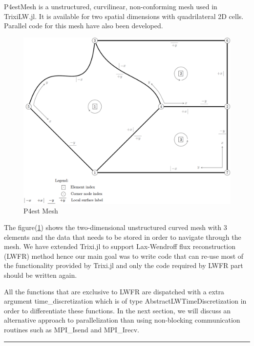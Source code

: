 {\ttfamily P4estMesh} is a unstructured, curvilinear, non-conforming mesh used in {\ttfamily TrixiLW.jl}. It is available for two spatial dimensions with quadrilateral 2D cells. Parallel code for this mesh have also been developed.
\begin{figure}[!ht]
    \centering
    \includegraphics[width=0.80\linewidth]{attachments/p4estmesh.png}
    \caption{P4est Mesh}
    \label{fig:4.2}
\end{figure}

The figure(\ref{fig:4.2}) shows the two-dimensional unstructured curved mesh with 3 elements and the data that needs to be stored in order to navigate through the mesh. We have extended {\ttfamily Trixi.jl} to support Lax-Wendroff flux reconstruction (LWFR) method hence our main goal was to write code that can re-use most of the functionality provided by {\ttfamily Trixi.jl} and only the code required by LWFR part should be written again.

All the functions that are exclusive to LWFR are dispatched with a extra argument {\ttfamily time\_discretization} which is of type {\ttfamily AbstractLWTimeDiscretization} in order to differentiate these functions. In the next section, we will discuss an alternative approach to parallelization than using non-blocking communication routines such as {\ttfamily MPI\_Isend} and {\ttfamily MPI\_Irecv}. 

\begin{center}
    \rule{3cm}{1pt}
\end{center}